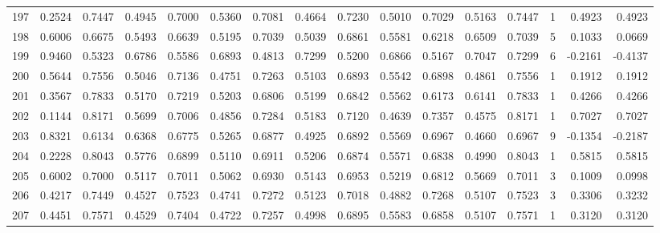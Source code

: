 \begin{tabular}{lrrrrrrrrrrrrrrr}
197 &      0.2524 &  0.7447 &  0.4945 &  0.7000 &  0.5360 &  0.7081 &  0.4664 &  0.7230 &  0.5010 &  0.7029 &   0.5163 &     0.7447 &      1 &                    0.4923 &                     0.4923 \\
198 &      0.6006 &  0.6675 &  0.5493 &  0.6639 &  0.5195 &  0.7039 &  0.5039 &  0.6861 &  0.5581 &  0.6218 &   0.6509 &     0.7039 &      5 &                    0.1033 &                     0.0669 \\
199 &      0.9460 &  0.5323 &  0.6786 &  0.5586 &  0.6893 &  0.4813 &  0.7299 &  0.5200 &  0.6866 &  0.5167 &   0.7047 &     0.7299 &      6 &                   -0.2161 &                    -0.4137 \\
200 &      0.5644 &  0.7556 &  0.5046 &  0.7136 &  0.4751 &  0.7263 &  0.5103 &  0.6893 &  0.5542 &  0.6898 &   0.4861 &     0.7556 &      1 &                    0.1912 &                     0.1912 \\
201 &      0.3567 &  0.7833 &  0.5170 &  0.7219 &  0.5203 &  0.6806 &  0.5199 &  0.6842 &  0.5562 &  0.6173 &   0.6141 &     0.7833 &      1 &                    0.4266 &                     0.4266 \\
202 &      0.1144 &  0.8171 &  0.5699 &  0.7006 &  0.4856 &  0.7284 &  0.5183 &  0.7120 &  0.4639 &  0.7357 &   0.4575 &     0.8171 &      1 &                    0.7027 &                     0.7027 \\
203 &      0.8321 &  0.6134 &  0.6368 &  0.6775 &  0.5265 &  0.6877 &  0.4925 &  0.6892 &  0.5569 &  0.6967 &   0.4660 &     0.6967 &      9 &                   -0.1354 &                    -0.2187 \\
204 &      0.2228 &  0.8043 &  0.5776 &  0.6899 &  0.5110 &  0.6911 &  0.5206 &  0.6874 &  0.5571 &  0.6838 &   0.4990 &     0.8043 &      1 &                    0.5815 &                     0.5815 \\
205 &      0.6002 &  0.7000 &  0.5117 &  0.7011 &  0.5062 &  0.6930 &  0.5143 &  0.6953 &  0.5219 &  0.6812 &   0.5669 &     0.7011 &      3 &                    0.1009 &                     0.0998 \\
206 &      0.4217 &  0.7449 &  0.4527 &  0.7523 &  0.4741 &  0.7272 &  0.5123 &  0.7018 &  0.4882 &  0.7268 &   0.5107 &     0.7523 &      3 &                    0.3306 &                     0.3232 \\
207 &      0.4451 &  0.7571 &  0.4529 &  0.7404 &  0.4722 &  0.7257 &  0.4998 &  0.6895 &  0.5583 &  0.6858 &   0.5107 &     0.7571 &      1 &                    0.3120 &                     0.3120 \\

\end{tabular}
